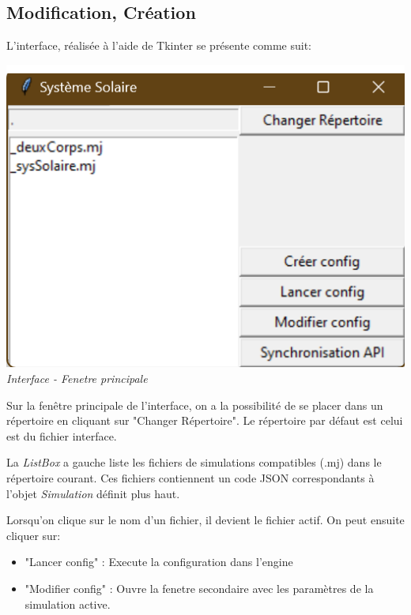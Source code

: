 \documentclass{article}
\begin{document}
    \subsection{Modification, Création}

    L'interface, réalisée à l'aide de Tkinter se présente comme suit:

    \begin{center}
        \includegraphics[scale=0.5]{mainInterface.png}\\    
        \emph{Interface - Fenetre principale}
    \end{center}

    Sur la fenêtre principale de l'interface, on a la possibilité de se placer dans un répertoire en cliquant sur "Changer Répertoire". Le répertoire par défaut est celui est du fichier interface.

    La \emph{ListBox} a gauche liste les fichiers de simulations compatibles (.mj) dans le répertoire courant. Ces fichiers contiennent un code JSON correspondants à l'objet \emph{Simulation} définit plus haut. 

    Lorsqu'on clique sur le nom d'un fichier, il devient le fichier actif. On peut ensuite cliquer sur:

    \begin{itemize}
        \item "Lancer config" : Execute la configuration dans l'engine
        \item "Modifier config" : Ouvre la fenetre secondaire avec les paramètres de la simulation active.
    \end{itemize}
\end{document}
